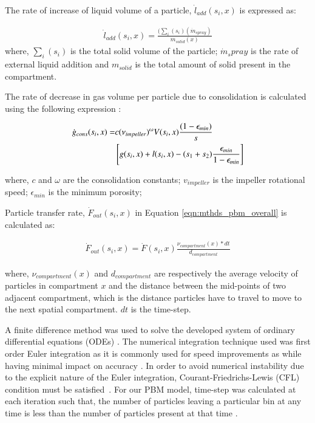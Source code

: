 \documentclass[preprint,10pt,authoryear,review]{elsarticle}
\begin{document}
\begin{linenumbers}
The rate of increase of liquid volume of a particle, 
$\dot{l}_{add}(s_i,x)$ is expressed as:

\begin{align}
\dot{l}_{add}(s_i,x) = \frac{(\sum_i(s_i)(\dot{m}_{spray})}{m_{solid}(x)}
\label{eqn:mthds_liq_addn_rate}
\end{align}
where, $\sum_i(s_i)$  is the total solid volume of the particle; $\dot{m}_spray$ is the 
rate of external liquid addition and $m_{solid}$ is the total amount of solid present in the compartment.

The rate of decrease in gas volume per particle due to consolidation is calculated using the 
following expression \citep{Verkoeijen2002}:

\begin{align}
\dot{g}_{cons}(s_i,x)=&c (\nu_{impeller})^{\omega}V(s_i,x)\frac{(1-\epsilon_{min})}{s} 
\notag \\ 
& \left[g(s_i,x)+l(s_i,x) -(s_1+s_2)\frac{\epsilon_{min}}{1-\epsilon_{min}}\right]
\label{eqn:mthds_rate_gas_vol_part}
\end{align}        

where, $c$ and $\omega$ are the consolidation constants; $v_{impeller}$ is the impeller 
rotational speed; $\epsilon_{min}$ is the minimum porosity; 

Particle transfer rate, $\dot{F}_{out}(s_i,x)$ in Equation \ref{eqn:mthds_pbm_overall} 
is calculated as:

\begin{align}
\dot{F}_{out}(s_i,x) = \dot{F}(s_i,x)\frac{\nu_{compartment}(x)*dt}{d_{compartment}}
\label{eqn:mthds_f_out_dot_part_trans_rate}
\end{align}

where, $\nu_{compartment}(x)$ and $d_{compartment}$ are respectively the average 
velocity of particles in compartment $x$ and the distance between the mid-points 
of two adjacent compartment, which is the distance particles have to travel to 
move to the next spatial compartment. $dt$ is the time-step.

A finite difference method was used to solve the developed system of ordinary differential 
equations (ODEs) \citep{Barrasso2015cerd}. The numerical integration technique used 
was first order Euler integration as it is commonly used for speed improvements as while 
having minimal impact on accuracy \citep{Barrasso2013}. In order to avoid numerical 
instability due to the explicit nature of the Euler integration, Courant-Friedrichs-Lewis 
(CFL) condition must be satisfied~\citep{courant1967}. For our PBM model, time-step was 
calculated at each iteration such that, the number of particles leaving a particular bin 
at any time is less than the number of particles present at that time \citep{Ramachandran2010}.


\end{linenumbers}
\end{document}
